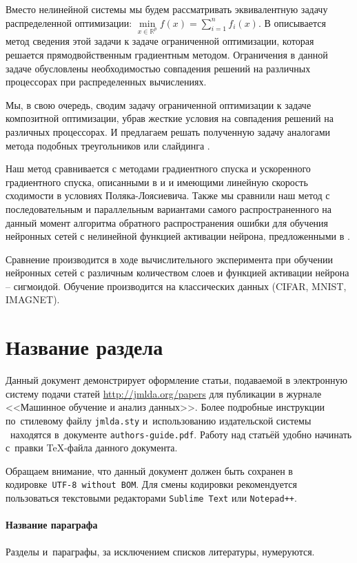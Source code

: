 \documentclass[12pt, twoside]{article}
\begin{document}
Вместо нелинейной системы мы будем рассматривать эквивалентную задачу распределенной оптимизации: $\min\limits_{x\in\mathbb{R}^p}f(x) = \sum\limits_{i=1}^nf_i(x)$. В \cite{Karimi1} описывается метод сведения этой задачи к задаче ограниченной оптимизации, которая решается прямодвойственным градиентным методом. Ограничения в данной задаче обусловлены необходимостью совпадения решений на различных процессорах при распределенных вычислениях.

Мы, в свою очередь, сводим задачу ограниченной оптимизации к задаче композитной оптимизации, убрав жесткие условия на совпадения решений на различных процессорах. И предлагаем решать полученную задачу аналогами метода подобных треугольников или слайдинга \cite{Gasnikov2}.

Наш метод сравнивается с методами градиентного спуска и ускоренного градиентного спуска, описанными в \cite{Karimi2} и \cite{Gasnikov1} и имеющими линейную скорость сходимости в условиях Поляка-Лоясиевича. Также мы сравнили наш метод с последовательным и параллельным вариантами самого распространенного на данный момент алгоритма обратного распространения ошибки для обучения нейронных сетей с нелинейной функцией активации нейрона, предложенными в \cite{Prafulla}.

Сравнение производится в ходе вычислительного эксперимента при обучении нейронных сетей с различным количеством слоев и функцией активации нейрона -- сигмоидой. Обучение производится на классических данных (CIFAR, MNIST, IMAGNET).

\section{Название раздела}
Данный документ демонстрирует оформление статьи,
подаваемой в электронную систему подачи статей \url{http://jmlda.org/papers} для публикации в журнале <<Машинное обучение и анализ данных>>.
Более подробные инструкции по~стилевому файлу \texttt{jmlda.sty} и~использованию издательской системы \LaTeXe\
находятся в~документе \texttt{authors-guide.pdf}.
Работу над статьёй удобно начинать с~правки \TeX-файла данного документа.

Обращаем внимание, что данный документ должен быть сохранен в кодировке~\verb'UTF-8 without BOM'.
Для смены кодировки рекомендуется пользоваться текстовыми редакторами \verb'Sublime Text' или \verb'Notepad++'.

\paragraph{Название параграфа}
Разделы и~параграфы, за исключением списков литературы, нумеруются.
\end{document}
